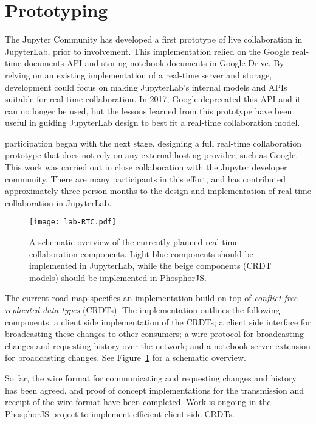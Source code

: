 \documentclass{deliverablereport}
\begin{document}

\section{Prototyping}

The Jupyter Community has developed a first prototype of live collaboration in JupyterLab,
prior to \ODK involvement.
This implementation relied on the Google real-time documents API and storing notebook documents in Google Drive.
By relying on an existing implementation of a real-time server and storage,
development could focus on making JupyterLab's
internal models and APIs suitable for real-time collaboration.
In 2017, Google deprecated this API and it can no longer be used,
but the lessons learned from this prototype have been useful in guiding JupyterLab design to best fit a real-time collaboration model.

\ODK participation began with the next stage, designing a full real-time collaboration prototype
that does not rely on any external hosting provider,
such as Google.
This work was carried out in close collaboration with the Jupyter developer community.
There are many participants in this effort, and \ODK has contributed approximately
three person-months to the design and implementation of real-time collaboration in JupyterLab.


\begin{figure}[h]
  \centering
  \texttt{[image: lab-RTC.pdf]}
  \caption{A schematic overview of the currently planned real time collaboration components.
    Light blue components should be implemented in JupyterLab, while the beige
    components (CRDT models) should be implemented in PhosphorJS.}
  \label{fig:rtc-components}
\end{figure}

The current road map specifies an implementation build on top of
\emph{conflict-free replicated data types} (CRDTs). The implementation outlines the
following components: a client side implementation of the CRDTs; a client side interface
for broadcasting these changes to other consumers; a wire protocol for broadcasting
changes and requesting history over the network; and a notebook server extension for broadcasting changes. See Figure~\ref{fig:rtc-components} for a schematic overview.

So far, the wire format for communicating and requesting changes and history has been
agreed, and proof of concept implementations for the transmission and receipt of the
wire format have been completed. Work is ongoing in the PhosphorJS project to implement
efficient client side CRDTs.
\end{document}
